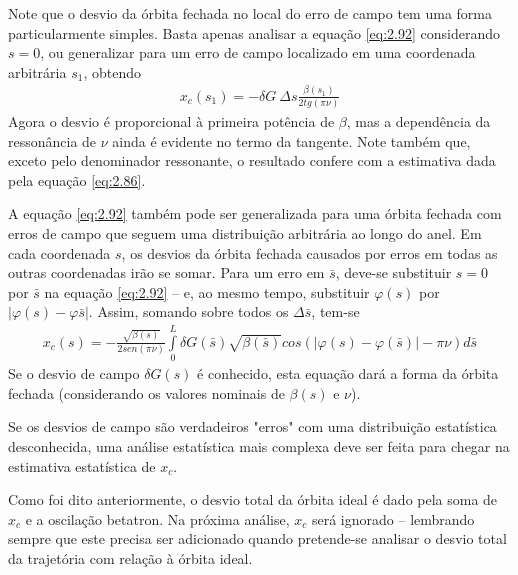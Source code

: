 Note que o desvio da órbita fechada no local do erro de campo tem uma forma particularmente simples. Basta apenas analisar a equação \eqref{eq:2.92} considerando $s=0$, ou generalizar para um erro de campo localizado em uma coordenada arbitrária $s_1$, obtendo
\begin{align}
	x_c(s_1) = -\delta G\ \Delta s \frac{\beta(s_1)}{2 tg(\pi\nu)}
\end{align}
Agora o desvio é proporcional à primeira potência de $\beta$, mas a dependência da ressonância de $\nu$ ainda é evidente no termo da tangente. Note também que, exceto pelo denominador ressonante, o resultado confere com a estimativa dada pela equação \eqref{eq:2.86}.

A equação \eqref{eq:2.92} também pode ser generalizada para uma órbita fechada com erros de campo que seguem uma distribuição arbitrária ao longo do anel. Em cada coordenada $s$, os desvios da órbita fechada causados por erros em todas as outras coordenadas irão se somar. Para um erro em $\bar{s}$, deve-se substituir $s=0$ por $\bar{s}$ na equação \eqref{eq:2.92} -- e, ao mesmo tempo, substituir $\varphi(s)$ por $|\varphi(s) - \varphi\bar{s}|$. Assim, somando sobre todos os $\Delta \bar{s}$, tem-se 
\begin{align}
	x_c(s) = -\frac{\sqrt{\beta(s)}}{2sen(\pi\nu)}\int\limits_{0}^{L}\delta G(\bar{s})\sqrt{\beta(\bar{s})}cos(|\varphi(s)-\varphi(\bar{s})|-\pi\nu)d\bar{s}\label{eq:2.94}
\end{align}
Se o desvio de campo $\delta G(s)$ é conhecido, esta equação dará a forma da órbita fechada (considerando os valores nominais de $\beta(s)$ e $\nu$).

Se os desvios de campo são verdadeiros "erros" com uma distribuição estatística desconhecida, uma análise estatística mais complexa deve ser feita para chegar na estimativa estatística de $x_c$.

Como foi dito anteriormente, o desvio total da órbita ideal é dado pela soma de $x_c$ e a oscilação betatron. Na próxima análise, $x_c$ será ignorado -- lembrando sempre que este precisa ser adicionado quando pretende-se analisar o desvio total da trajetória com relação à órbita ideal.
